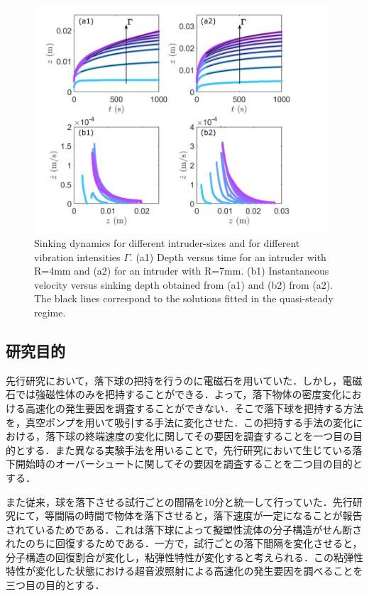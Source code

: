 \clearpage
\begin{figure}[ht]
    \begin{center}
        \includegraphics[width=11.0cm,clip]{1-Background/4-sinking.png}
        \caption{Sinking dynamics for different intruder-sizes and for different vibration intensities $\Gamma$. (a1) Depth versus time for an intruder with R=4mm and (a2) for an intruder with R=7mm. (b1) Instantaneous velocity versus sinking depth obtained from (a1) and (b2) from (a2). The black lines correspond to the solutions fitted in the quasi-steady regime\cite{ref:6}.}
        \label{fig:4-sinking}
    \end{center}
\end{figure}

\subsection{研究目的}

先行研究\cite{ref:8}において，落下球の把持を行うのに電磁石を用いていた．しかし，電磁石では強磁性体のみを把持することができる．よって，落下物体の密度変化における高速化の発生要因を調査することができない．そこで落下球を把持する方法を，真空ポンプを用いて吸引する手法に変化させた．この把持する手法の変化における，落下球の終端速度の変化に関してその要因を調査することを一つ目の目的とする．また異なる実験手法を用いることで，先行研究において生じている落下開始時のオーバーシュートに関してその要因を調査することを二つ目の目的とする．

また従来，球を落下させる試行ごとの間隔を10分と統一して行っていた．先行研究\cite{ref:8-5}にて，等間隔の時間で物体を落下させると，落下速度が一定になることが報告されているためである．これは落下球によって擬塑性流体の分子構造がせん断されたのちに回復するためである．一方で，試行ごとの落下間隔を変化させると，分子構造の回復割合が変化し，粘弾性特性が変化すると考えられる．この粘弾性特性が変化した状態における超音波照射による高速化の発生要因を調べることを三つ目の目的とする．
